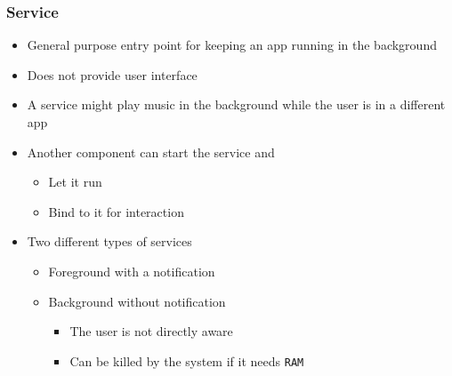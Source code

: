 %
%

\begin{frame}
  \frametitle{Service}
  
  \begin{itemize}
  \item<1-> General purpose entry point for keeping an app running in
    the background
  
  \item<2-> Does not provide user interface

  \item<3-> A service might play music in the background while the
    user is in a different app

  \item<4-> Another component can start the service and 

    \begin{itemize}
    \item<4-> Let it run
    \item<4-> Bind to it for interaction
    \end{itemize}

  \item<5-> Two different types of services

    \begin{itemize}
    \item<6-> Foreground with a notification
    \item<7-> Background without notification
      \begin{itemize}
      \item<7-> The user is not directly aware
      \item<7-> Can be killed by the system if it needs \texttt{RAM}
      \end{itemize}
    \end{itemize}

  \end{itemize}

\end{frame}


